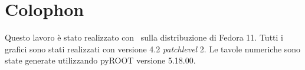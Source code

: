 \thispagestyle{empty}

\hfill

\vfill

\section*{Colophon}

Questo lavoro \`e stato realizzato con \LaTeXe\ sulla distribuzione di
\linux{} Fedora 11. Tutti i grafici sono stati realizzati con \gnuplot{}
versione 4.2 \emph{patchlevel} 2. Le tavole numeriche sono state generate
utilizzando pyROOT versione 5.18.00.
